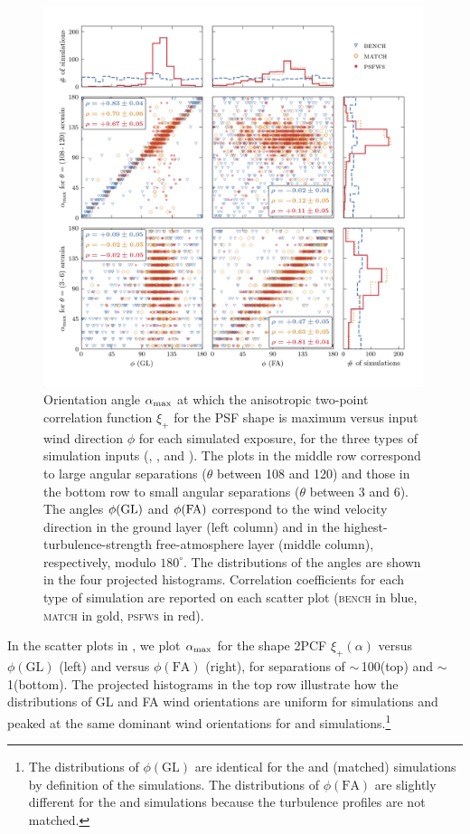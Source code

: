 \documentclass[twocolumn,twocolappendix]{openjournal}
\begin{document}
\begin{figure}
\includegraphics[width=0.99\textwidth]{f7_alphamax_scatter.png}
    \caption{Orientation angle $\alpha_{\rm max}$ at which the anisotropic two-point correlation function $\xi_{+}$ for the PSF shape is maximum versus input wind direction $\phi$ for each simulated exposure, for the three types of simulation inputs (\bench, \match, and \psfwssims).
    The plots in the middle row correspond to large angular separations ($\theta$ between 108 and 120\amin) and those in the bottom row to small angular separations ($\theta$ between 3 and 6\amin).
    The angles $\phi({\rm GL})$ and $\phi({\rm FA})$ correspond to the wind velocity direction in the ground layer (left column) and in the highest-turbulence-strength free-atmosphere layer (middle column), respectively, modulo $180^\circ$. 
    The distributions of the angles are shown in the four projected histograms.
    Correlation coefficients for each type of simulation are reported on each scatter plot (\textsc{bench} in blue, \textsc{match} in gold, \textsc{psfws} in red).
    \label{fig:bigscatter}
    }
\end{figure}

In the scatter plots in , we plot $\alpha_{\rm max}$ for the shape 2PCF $\xi_+(\alpha)$ versus $\phi(\text{GL})$ (left) and versus $\phi(\text{FA})$ (right), for separations of $\sim\,$100\amin (top) and $\sim\,$1\amin (bottom).  
The projected histograms in the top row illustrate how the distributions of GL and FA wind orientations are uniform for \bench simulations and peaked at the same dominant wind orientations for \psfwssims and \match simulations.\footnote{The distributions of $\phi(\text{GL})$ are identical for the \psfwssims and \match (matched) simulations by definition of the \match simulations. The distributions of $\phi(\text{FA})$ are slightly different for the \psfwssims and \match simulations because the turbulence profiles are not matched.}  
\end{document}
